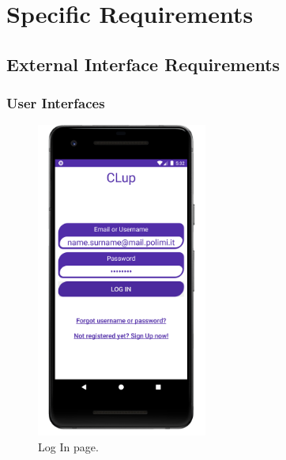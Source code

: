 \chapter{Specific Requirements}

\section{External Interface Requirements}

\subsection{User Interfaces}

\begin{figure}[h]
	\centering

	\includegraphics[width=0.5\textwidth]{images/log_in.png}
	\caption{Log In page.}
	\label{customersUseCasesDiagram}
\end{figure}

